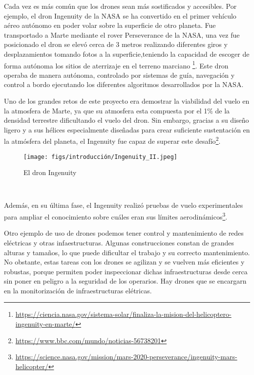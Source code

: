 Cada vez es más común que los drones sean más sostificados y accesibles. Por ejemplo, el dron Ingenuity de la NASA se ha convertido en el primer vehículo aéreo autónomo en poder volar
sobre la superficie de otro planeta. Fue transportado a Marte mediante el rover Perseverance de la NASA, una vez fue posicionado el dron se elevó cerca de 3 metros realizando 
diferentes giros y desplazamientos tomando fotos a la superficie,teniendo la capacidad de escoger de forma autónoma los sitios de aterrizaje en el terreno marciano \footnote{\url{https://ciencia.nasa.gov/sistema-solar/finaliza-la-mision-del-helicoptero-ingenuity-en-marte/}}.
Este dron operaba de manera autónoma, controlado por sistemas de guía, navegación y control a bordo ejecutando los diferentes algoritmos desarrollados por la NASA. 

Uno de los grandes retos de este proyecto era demostrar la viabilidad del vuelo en la atmosfera de Marte, ya que su atmosfera esta compuesta por el 1\% de la densidad terrestre
dificultando el vuelo del dron. Sin embargo, gracias a su diseño ligero y a sus hélices especialmente diseñadas para crear suficiente sustentación en la atmósfera del planeta, el Ingenuity 
fue capaz de superar este desafío\footnote{\url{https://www.bbc.com/mundo/noticias-56738201}}. \newline
\begin{figure} [H]
  \begin{center}
    \texttt{[image: figs/introducción/Ingenuity\_II.jpeg]}
  \end{center}
  \caption{El dron Ingenuity}
  \label{fig:Ingenuity}
\end{figure}\

Además, en su última fase, el Ingenuity realizó pruebas de vuelo experimentales para ampliar el conocimiento sobre cuáles eran sus límites aerodinámicos\footnote{\url{https://science.nasa.gov/mission/mars-2020-perseverance/ingenuity-mars-helicopter/}}.\newline

Otro ejemplo de uso de drones podemos tener control y mantenimiento de redes eléctricas y otras infaestructuras. Algunas construcciones constan de grandes alturas y tamaños, lo que puede
dificultar el trabajo y su correcto mantenimiento. No obstante, estas tareas con los drones se agilizan y se vuelven más eficientes y robustas, porque permiten poder
inspeccionar dichas infraestructuras desde cerca sin poner en peligro a la seguridad de los operarios. 
Hay drones que se encargarn en la monitorización de infraestructuras elétricas. \newline

